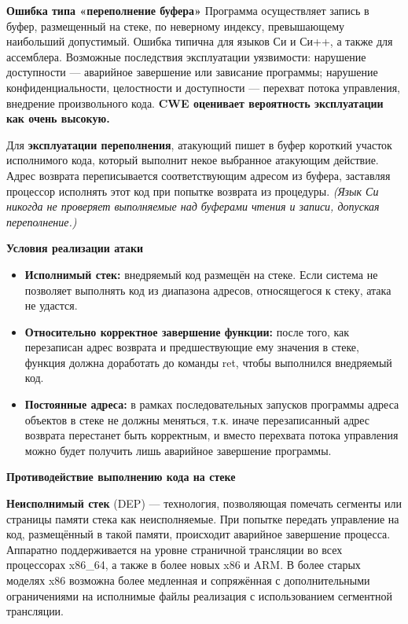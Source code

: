 
\textbf{Ошибка типа «переполнение буфера»}
Программа осуществляет запись в буфер, размещенный на стеке, по неверному индексу, превышающему наибольший допустимый. Ошибка типична для языков Си и Си++, а также для ассемблера. Возможные последствия эксплуатации уязвимости: нарушение доступности — аварийное завершение или зависание программы; нарушение конфиденциальности, целостности и доступности — перехват потока управления, внедрение произвольного кода. \textbf{CWE оценивает вероятность эксплуатации как очень высокую.}

Для \textbf{эксплуатации переполнения}, атакующий пишет в буфер короткий участок исполнимого кода, который выполнит некое выбранное атакующим действие. Адрес возврата переписывается соответствующим адресом из буфера, заставляя процессор исполнять этот код при попытке возврата из процедуры.
\textit{(Язык Си никогда не проверяет выполняемые над буферами чтения и записи, допуская переполнение.)}


\textbf{Условия реализации атаки}
\begin{itemize}
    \item \textbf{Исполнимый стек:} внедряемый код размещён на стеке. Если система не позволяет выполнять код из диапазона адресов, относящегося к стеку, атака не удастся.
    \item \textbf{Относительно корректное завершение функции:} после того, как перезаписан адрес возврата и предшествующие ему значения в стеке, функция должна доработать до команды ret, чтобы выполнился внедряемый код.
    \item \textbf{Постоянные адреса: }в рамках последовательных запусков программы адреса объектов в стеке не должны меняться, т.к. иначе перезаписанный адрес возврата перестанет быть корректным, и вместо перехвата потока управления можно будет получить лишь аварийное завершение программы.
\end{itemize}

\textbf{Противодействие выполнению кода на стеке}

\textbf{Неисполнимый стек} (DEP) — технология, позволяющая помечать сегменты или страницы памяти стека как неисполняемые. При попытке передать управление на код, размещённый в такой памяти, происходит аварийное завершение процесса. Аппаратно поддерживается на уровне страничной трансляции во всех процессорах x86\_64, а также в более новых x86 и ARM. В более старых моделях x86 возможна более медленная и сопряжённая с дополнительными ограничениями на исполнимые файлы реализация с использованием сегментной трансляции.

